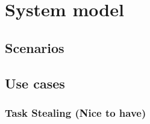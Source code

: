 \section{System model}

\subsection{Scenarios}
\newpage

\subsection{Use cases}

\subsubsection{Task Stealing (Nice to have)}
\vspace{0.4mm}


